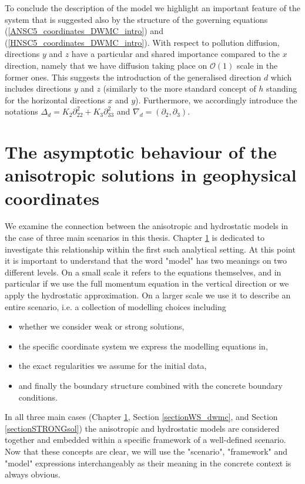 \documentclass[12pt]{report}
\numberwithin{theorem}{chapter}
\numberwithin{corollary}{chapter}
\numberwithin{lemma}{chapter}
\numberwithin{remark}{chapter}
\numberwithin{definition}{chapter}
\numberwithin{prop}{chapter}
\begin{document}
To conclude the description of the model we highlight an important feature of the system that is suggested also by the structure of the governing equations (\ref{ANSC5_coordinates_DWMC_intro}) and (\ref{HNSC5_coordinates_DWMC_intro}). With respect to pollution diffusion, directions $y$ and $z$ have a particular and shared importance compared to the $x$ direction, namely that we have diffusion taking place on $\mathcal{O}(1)$ scale in the former ones. This suggests the introduction of the generalised direction $d$ which includes directions $y$ and $z$ (similarly to the more standard concept of $h$ standing for the horizontal directions $x$ and $y$). Furthermore, we accordingly introduce the notations $\Delta_d = K_2 \partial_{22}^2 + K_3 \partial_{33}^2$ and $\nabla_d = (\partial_2, \partial_3).$

\chapter{The asymptotic behaviour of the anisotropic solutions in geophysical coordinates}\label{geophysicalchapter}

We examine the connection between the anisotropic and hydrostatic models in the case of three main scenarios in this thesis. Chapter \ref{geophysicalchapter} is dedicated to investigate this relationship within the first such analytical setting. At this point it is important to understand that the word "model" has two meanings on two different levels. On a small scale it refers to the equations themselves, and in particular if we use the full momentum equation in the vertical direction or we apply the hydrostatic approximation. On a larger scale we use it to describe an entire scenario, i.e. a collection of modelling choices including

\begin{itemize}
  \item[--] whether we consider weak or strong solutions,
  \item[--] the specific coordinate system we express the modelling equations in,
  \item[--] the exact regularities we assume for the initial data,
  \item[--] and finally the boundary structure combined with the concrete boundary conditions.
\end{itemize}

In all three main cases (Chapter \ref{geophysicalchapter}, Section \ref{sectionWS_dwmc}, and Section \ref{sectionSTRONGsol}) the anisotropic and hydrostatic models are considered together and embedded within a specific framework of a well-defined scenario. Now that these concepts are clear, we will use the "scenario", "framework" and "model" expressions interchangeably as their meaning in the concrete context is always obvious.
\end{document}
